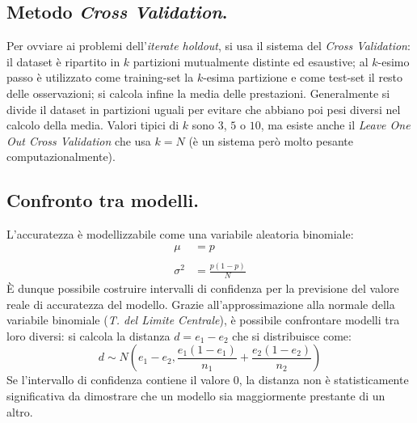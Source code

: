 \documentclass[11pt, a4page, twocolumn]{article}
\begin{document}
\subsection{Metodo \textit{Cross Validation}.}
Per ovviare ai problemi dell'\textit{iterate holdout}, si usa il sistema del \textit{Cross Validation}: il dataset è ripartito in $k$ partizioni mutualmente distinte ed esaustive; al $k$-esimo passo è utilizzato come training-set la $k$-esima partizione e come test-set il resto delle osservazioni; si calcola infine la media delle prestazioni.
Generalmente si divide il dataset in partizioni uguali per evitare che abbiano poi pesi diversi nel calcolo della media.
Valori tipici di $k$ sono $3$, $5$ o $10$, ma esiste anche il \textit{Leave One Out Cross Validation} che usa $k = N$ (è un sistema però molto pesante computazionalmente).

\subsection{Confronto tra modelli.}
L'accuratezza è modellizzabile come una variabile aleatoria binomiale:
\begin{align*}
  \mu &= p \\ \\
  \sigma^2 &= \frac{p (1 - p)}{N}
\end{align*}
È dunque possibile costruire intervalli di confidenza per la previsione del valore reale di accuratezza del modello.
Grazie all'approssimazione alla normale della variabile binomiale (\textit{T. del Limite Centrale}), è possibile confrontare modelli tra loro diversi: si calcola la distanza $d = e_1 - e_2$ che si distribuisce come:
\begin{equation*}
  d \sim N(e_1 - e_2, \frac{e_1 (1 - e_1)}{n_1} + \frac{e_2 (1 - e_2)}{n_2})
\end{equation*}
Se l'intervallo di confidenza contiene il valore $0$, la distanza non è statisticamente significativa da dimostrare che un modello sia maggiormente prestante di un altro.
\end{document}

